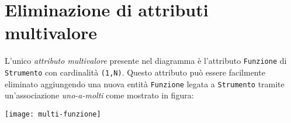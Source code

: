 \section{Eliminazione di attributi multivalore}\label{sec:multivalue}
L'unico {\it attributo multivalore} presente nel diagramma è l'attributo {\tt Funzione} di {\tt Strumento}
con cardinalità {\tt (1,N)}. Questo attributo può essere facilmente eliminato aggiungendo
una nuova entità {\tt Funzione} legata a {\tt Strumento} tramite un'associazione {\it uno-a-molti}
come mostrato in figura:

\vspace{5pt}\centerline{\texttt{[image: multi-funzione]}}

